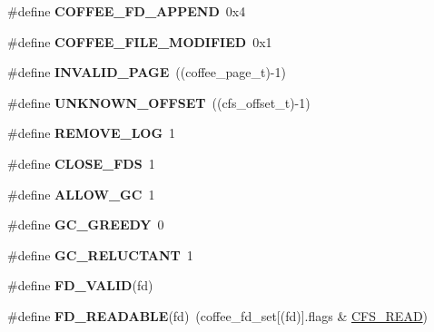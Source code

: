 \begin{DoxyCompactItemize}
\item 
\hypertarget{cfs-coffee_8c_a3ad45d569645035363c7c57572714a04}{}\#define {\bfseries C\+O\+F\+F\+E\+E\+\_\+\+F\+D\+\_\+\+A\+P\+P\+E\+N\+D}~0x4\label{cfs-coffee_8c_a3ad45d569645035363c7c57572714a04}

\item 
\hypertarget{cfs-coffee_8c_a00d7fa71bbf8d3b07dce20e268fb69c4}{}\#define {\bfseries C\+O\+F\+F\+E\+E\+\_\+\+F\+I\+L\+E\+\_\+\+M\+O\+D\+I\+F\+I\+E\+D}~0x1\label{cfs-coffee_8c_a00d7fa71bbf8d3b07dce20e268fb69c4}

\item 
\hypertarget{cfs-coffee_8c_a3c288eb66f2e35c181f744b6642b92e2}{}\#define {\bfseries I\+N\+V\+A\+L\+I\+D\+\_\+\+P\+A\+G\+E}~((coffee\+\_\+page\+\_\+t)-\/1)\label{cfs-coffee_8c_a3c288eb66f2e35c181f744b6642b92e2}

\item 
\hypertarget{cfs-coffee_8c_a1c286b9b8a32c3f440c107e563e378d8}{}\#define {\bfseries U\+N\+K\+N\+O\+W\+N\+\_\+\+O\+F\+F\+S\+E\+T}~((cfs\+\_\+offset\+\_\+t)-\/1)\label{cfs-coffee_8c_a1c286b9b8a32c3f440c107e563e378d8}

\item 
\hypertarget{cfs-coffee_8c_aa9d5d044838d261946d072ff91b2f976}{}\#define {\bfseries R\+E\+M\+O\+V\+E\+\_\+\+L\+O\+G}~1\label{cfs-coffee_8c_aa9d5d044838d261946d072ff91b2f976}

\item 
\hypertarget{cfs-coffee_8c_ad554314d31354d3ab586a56b8aa1bd21}{}\#define {\bfseries C\+L\+O\+S\+E\+\_\+\+F\+D\+S}~1\label{cfs-coffee_8c_ad554314d31354d3ab586a56b8aa1bd21}

\item 
\hypertarget{cfs-coffee_8c_a1ab74924434d6a3e12bf26e4ca243eda}{}\#define {\bfseries A\+L\+L\+O\+W\+\_\+\+G\+C}~1\label{cfs-coffee_8c_a1ab74924434d6a3e12bf26e4ca243eda}

\item 
\hypertarget{cfs-coffee_8c_a9be2f76ee0cffd54416e8b2af0f5e2c2}{}\#define {\bfseries G\+C\+\_\+\+G\+R\+E\+E\+D\+Y}~0\label{cfs-coffee_8c_a9be2f76ee0cffd54416e8b2af0f5e2c2}

\item 
\hypertarget{cfs-coffee_8c_a2fb8f74a9cd7bfb8359c60070438992f}{}\#define {\bfseries G\+C\+\_\+\+R\+E\+L\+U\+C\+T\+A\+N\+T}~1\label{cfs-coffee_8c_a2fb8f74a9cd7bfb8359c60070438992f}

\item 
\#define {\bfseries F\+D\+\_\+\+V\+A\+L\+I\+D}(fd)
\item 
\hypertarget{cfs-coffee_8c_afa87a83f44ec6c5939e4487b0970b899}{}\#define {\bfseries F\+D\+\_\+\+R\+E\+A\+D\+A\+B\+L\+E}(fd)~(coffee\+\_\+fd\+\_\+set\mbox{[}(fd)\mbox{]}.flags \& \hyperlink{group__cfs_ga00fed0156dbcbd1214203c7f2507e376}{C\+F\+S\+\_\+\+R\+E\+A\+D})\label{cfs-coffee_8c_afa87a83f44ec6c5939e4487b0970b899}


\end{DoxyCompactItemize}

